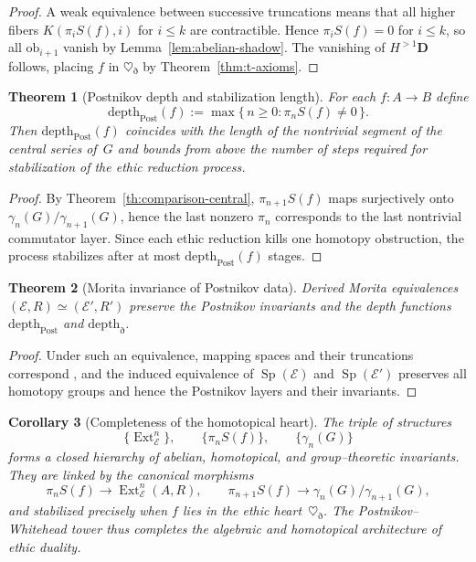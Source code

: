 \documentclass[12pt]{article}
\DeclareMathOperator{\Sp}{Sp}
\newcommand{\E}{\mathcal{E}}
\newcommand{\Ext}{\operatorname{Ext}}
\theoremstyle{plain}
\newtheorem{theorem}{Theorem}[section]
\newtheorem{corollary}[theorem]{Corollary}
\theoremstyle{definition}
\theoremstyle{remark}
\numberwithin{equation}{section}
\begin{document}
\begin{proof}
A weak equivalence between successive truncations means
that all higher fibers $K(\pi_iS(f),i)$ for $i\le k$ are contractible.
Hence $\pi_iS(f)=0$ for $i\le k$,
so all $\mathrm{ob}_{i+1}$ vanish by Lemma~\ref{lem:abelian-shadow}.
The vanishing of $H^{>1}\mathbf D$ follows,
placing $f$ in $\heartsuit_\eth$ by Theorem~\ref{thm:t-axioms}.
\end{proof}

\begin{theorem}[Postnikov depth and stabilization length]\label{th:depth-stabilization}
For each $f:A\to B$ define
\[
\mathrm{depth}_{\mathrm{Post}}(f)
:=\max\{\,n\ge0:\pi_nS(f)\neq0\,\}.
\]
Then $\mathrm{depth}_{\mathrm{Post}}(f)$ coincides with the length of the nontrivial segment of the central series of~$G$
and bounds from above the number of steps required for stabilization of the ethic reduction process.
\end{theorem}

\begin{proof}
By Theorem~\ref{th:comparison-central}, $\pi_{n+1}S(f)$ maps surjectively onto $\gamma_n(G)/\gamma_{n+1}(G)$, hence the last nonzero $\pi_n$ corresponds to the last nontrivial commutator layer.
Since each ethic reduction kills one homotopy obstruction, the process stabilizes after at most $\mathrm{depth}_{\mathrm{Post}}(f)$ stages.
\end{proof}

\begin{theorem}[Morita invariance of Postnikov data]\label{th:morita-postnikov}
Derived Morita equivalences $(\E,R)\simeq(\E',R')$
preserve the Postnikov invariants and the depth functions $\mathrm{depth}_{\mathrm{Post}}$ and $\mathrm{depth}_\eth$.
\end{theorem}

\begin{proof}
Under such an equivalence, mapping spaces and their truncations correspond
\cite{LurieHA},
and the induced equivalence of $\Sp(\E)$ and $\Sp(\E')$
preserves all homotopy groups and hence the Postnikov layers and their invariants.
\end{proof}

\begin{corollary}[Completeness of the homotopical heart]\label{cor:homotopical-core}
The triple of structures
\[
\{\Ext^n_\E\},\qquad\{\pi_nS(f)\},\qquad\{\gamma_n(G)\}
\]
forms a closed hierarchy of abelian, homotopical, and group–theoretic invariants.
They are linked by the canonical morphisms
\[
\pi_nS(f)\longrightarrow\Ext^n_\E(A,R),\qquad
\pi_{n+1}S(f)\longrightarrow\gamma_n(G)/\gamma_{n+1}(G),
\]
and stabilized precisely when $f$ lies in the ethic heart~$\heartsuit_\eth$.
The Postnikov–Whitehead tower thus completes the algebraic and homotopical architecture of ethic duality.
\end{corollary}
\end{document}
